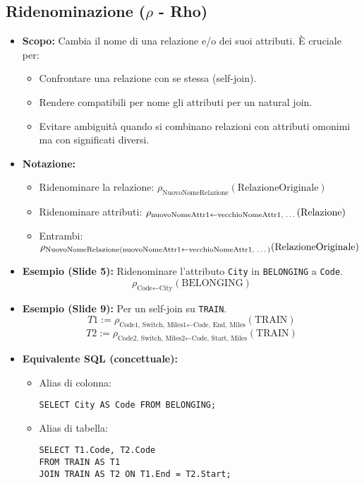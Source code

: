 \subsection{\texorpdfstring{Ridenominazione ($\rho$ - Rho)}{Ridenominazione (rho - Rho)}}
\begin{itemize}
    \item \textbf{Scopo:} Cambia il nome di una relazione e/o dei suoi attributi. È cruciale per:
    \begin{itemize}
        \item Confrontare una relazione con se stessa (self-join).
        \item Rendere compatibili per nome gli attributi per un natural join.
        \item Evitare ambiguità quando si combinano relazioni con attributi omonimi ma con significati diversi.
    \end{itemize}
    \item \textbf{Notazione:}
    \begin{itemize}
        \item Ridenominare la relazione: $\rho_{\text{NuovoNomeRelazione}}(\text{RelazioneOriginale})$
        \item Ridenominare attributi: $\rho_{\text{nuovoNomeAttr1} \leftarrow \text{vecchioNomeAttr1, \dots}}(\text{Relazione})$
        \item Entrambi: $\rho_{\text{NuovoNomeRelazione}(\text{nuovoNomeAttr1} \leftarrow \text{vecchioNomeAttr1, \dots})}(\text{RelazioneOriginale})$
    \end{itemize}
    \item \textbf{Esempio (Slide 5):} Ridenominare l'attributo \texttt{City} in \texttt{BELONGING} a \texttt{Code}.
          \[ \rho_{\text{Code} \leftarrow \text{City}}(\text{BELONGING}) \]
    \item \textbf{Esempio (Slide 9):} Per un self-join su \texttt{TRAIN}.
          \[ T1 := \rho_{\text{Code1, Switch, Miles1} \leftarrow \text{Code, End, Miles}}(\text{TRAIN}) \]
          \[ T2 := \rho_{\text{Code2, Switch, Miles2} \leftarrow \text{Code, Start, Miles}}(\text{TRAIN}) \]
    \item \textbf{Equivalente SQL (concettuale):}
    \begin{itemize}
        \item Alias di colonna:
\begin{verbatim}
SELECT City AS Code FROM BELONGING;
\end{verbatim}
        \item Alias di tabella:
\begin{verbatim}
SELECT T1.Code, T2.Code
FROM TRAIN AS T1
JOIN TRAIN AS T2 ON T1.End = T2.Start;
\end{verbatim}
    \end{itemize}
\end{itemize}

